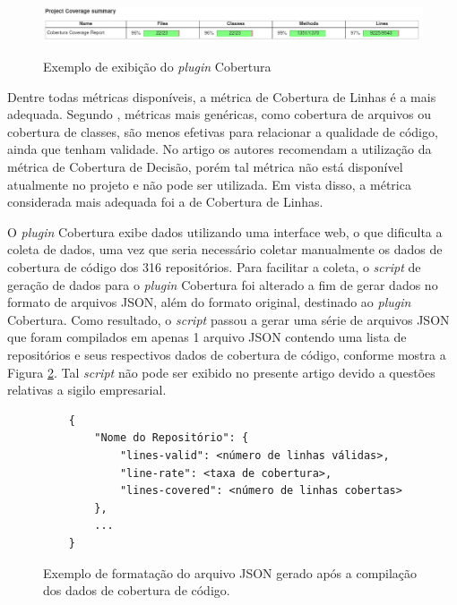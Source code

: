 \documentclass[11.5pt]{article}
\begin{document}
\begin{figure}[ht]
    \centering
    \includegraphics[width=1.0\textwidth]{cobertura.jpeg}
    \label{fig:pluginCobertura}
    \caption{Exemplo de exibição do \textit{plugin} Cobertura}
\end{figure}

Dentre todas métricas disponíveis, a métrica de Cobertura de Linhas é a mais adequada.
Segundo \cite{coverageMetaAnalysis}, métricas mais genéricas, como cobertura de arquivos ou
cobertura de classes, são menos efetivas para relacionar a qualidade de código, ainda que tenham
validade.
No artigo os autores recomendam a utilização da métrica de Cobertura de Decisão, porém tal métrica
não está disponível atualmente no projeto e não pode ser utilizada.
Em vista disso, a métrica considerada mais adequada foi a de Cobertura de Linhas.

O \textit{plugin} Cobertura exibe dados utilizando uma interface web, o que dificulta a coleta de
dados, uma vez que seria necessário coletar manualmente os dados de cobertura de código dos 316
repositórios.
Para facilitar a coleta, o \textit{script} de geração de dados para o \textit{plugin} Cobertura
foi alterado a fim de gerar dados no formato de arquivos JSON, além do formato original, destinado
ao \textit{plugin} Cobertura.
Como resultado, o \textit{script} passou a gerar uma série de arquivos JSON que foram compilados em
apenas 1 arquivo JSON contendo uma lista de repositórios e seus respectivos dados de cobertura de
código, conforme mostra a Figura \ref{fig:formatoJsonCoverage}.
Tal \textit{script} não pode ser exibido no presente artigo devido a questões relativas a sigilo
empresarial.


\begin{figure}[ht]
\label{fig:formatoJsonCoverage}
\small
\begin{verbatim}
    {
        "Nome do Repositório": {
            "lines-valid": <número de linhas válidas>,
            "line-rate": <taxa de cobertura>,
            "lines-covered": <número de linhas cobertas>
        },
        ...
    }
\end{verbatim}

\caption{Exemplo de formatação do arquivo JSON gerado após a compilação dos dados de cobertura
de código.}
\end{figure}
\end{document}
